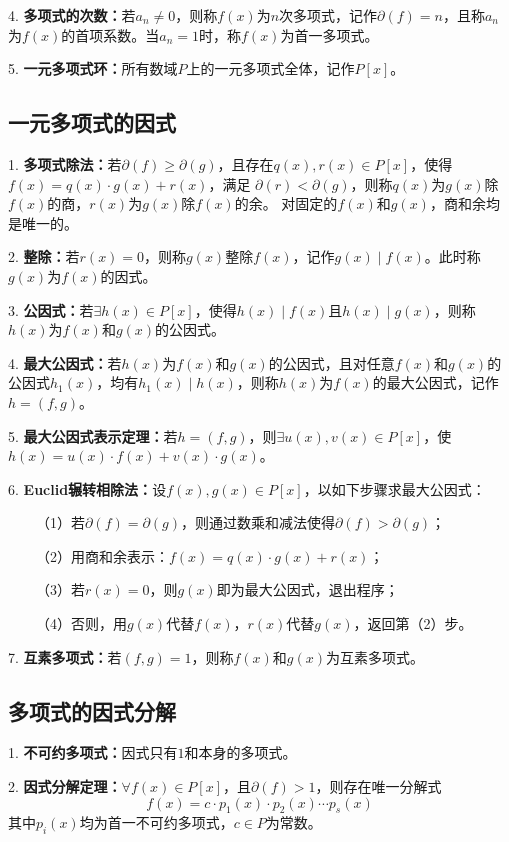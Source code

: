 4. \textbf{多项式的次数：}若$a_n\neq 0$，则称$f(x)$为$n$次多项式，记作$\partial(f)=n$，且称$a_n$为$f(x)$的首项系数。当$a_n=1$时，称$f(x)$为首一多项式。

5. \textbf{一元多项式环：}所有数域$P$上的一元多项式全体，记作$P[x]$。

\subsection{一元多项式的因式}

1. \textbf{多项式除法：}若$\partial(f)\geqslant \partial(g)$，且存在$q(x),r(x)\in P[x]$，使得$f(x)=q(x)\cdot g(x)+r(x)$，满足
$\partial(r)<\partial(g)$，则称$q(x)$为$g(x)$除$f(x)$的商，$r(x)$为$g(x)$除$f(x)$的余。
对固定的$f(x)$和$g(x)$，商和余均是唯一的。

2. \textbf{整除：}若$r(x)=0$，则称$g(x)$整除$f(x)$，记作$g(x)\mid f(x)$。此时称$g(x)$为$f(x)$的因式。

3. \textbf{公因式：}若$\exists h(x)\in P[x]$，使得$h(x)\mid f(x)$且$h(x)\mid g(x)$，则称$h(x)$为$f(x)$和$g(x)$的公因式。

4. \textbf{最大公因式：}若$h(x)$为$f(x)$和$g(x)$的公因式，且对任意$f(x)$和$g(x)$的公因式$h_1(x)$，均有$h_1(x)\mid h(x)$，则称$h(x)$为$f(x)$的最大公因式，记作$h=(f,g)$。

5. \textbf{最大公因式表示定理：}若$h=(f,g)$，则$\exists u(x),v(x)\in P[x]$，使$h(x)=u(x)\cdot f(x)+v(x)\cdot g(x)$。

6. \textbf{Euclid辗转相除法：}设$f(x),g(x)\in P[x]$，以如下步骤求最大公因式：

~~~~（1）若$\partial(f)=\partial(g)$，则通过数乘和减法使得$\partial(f)>\partial(g)$；

~~~~（2）用商和余表示：$f(x)=q(x)\cdot g(x)+r(x)$；

~~~~（3）若$r(x)=0$，则$g(x)$即为最大公因式，退出程序；

~~~~（4）否则，用$g(x)$代替$f(x)$，$r(x)$代替$g(x)$，返回第（2）步。

7. \textbf{互素多项式：}若$(f,g)=1$，则称$f(x)$和$g(x)$为互素多项式。

\subsection{多项式的因式分解}

1. \textbf{不可约多项式：}因式只有$1$和本身的多项式。

2. \textbf{因式分解定理：}$\forall f(x)\in P[x]$，且$\partial(f)>1$，则存在唯一分解式
\begin{equation*}
    f(x)=c\cdot p_1(x)\cdot p_2(x)\cdots p_s(x)
\end{equation*}
其中$p_i(x)$均为首一不可约多项式，$c\in P$为常数。

